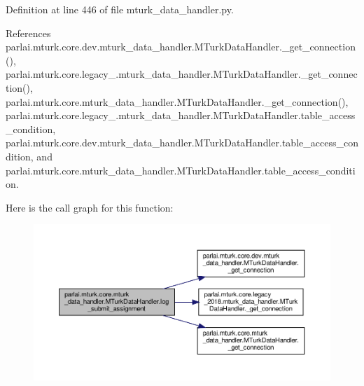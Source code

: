 Definition at line 446 of file mturk\+\_\+data\+\_\+handler.\+py.



References parlai.\+mturk.\+core.\+dev.\+mturk\+\_\+data\+\_\+handler.\+M\+Turk\+Data\+Handler.\+\_\+get\+\_\+connection(), parlai.\+mturk.\+core.\+legacy\+\_.\+mturk\+\_\+data\+\_\+handler.\+M\+Turk\+Data\+Handler.\+\_\+get\+\_\+connection(), parlai.\+mturk.\+core.\+mturk\+\_\+data\+\_\+handler.\+M\+Turk\+Data\+Handler.\+\_\+get\+\_\+connection(), parlai.\+mturk.\+core.\+legacy\+\_.\+mturk\+\_\+data\+\_\+handler.\+M\+Turk\+Data\+Handler.\+table\+\_\+access\+\_\+condition, parlai.\+mturk.\+core.\+dev.\+mturk\+\_\+data\+\_\+handler.\+M\+Turk\+Data\+Handler.\+table\+\_\+access\+\_\+condition, and parlai.\+mturk.\+core.\+mturk\+\_\+data\+\_\+handler.\+M\+Turk\+Data\+Handler.\+table\+\_\+access\+\_\+condition.

Here is the call graph for this function\+:
\nopagebreak
\begin{figure}[H]
\begin{center}
\leavevmode
\includegraphics[width=350pt]{classparlai_1_1mturk_1_1core_1_1mturk__data__handler_1_1MTurkDataHandler_a2cebff3c6da14d643bd2bfedce73ba4a_cgraph}
\end{center}
\end{figure}
\mbox{\label{classparlai_1_1mturk_1_1core_1_1mturk__data__handler_1_1MTurkDataHandler_a080c2ffbf861cfe6175491a7a0bdd0ce}} 
